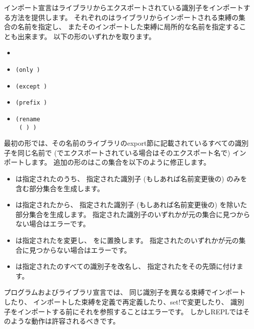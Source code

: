 インポート宣言はライブラリからエクスポートされている識別子をインポートする方法を提供します。
それぞれのはライブラリからインポートされる束縛の集合の名前を指定し、
またそのインポートした束縛に局所的な名前を指定することも出来ます。
以下の形のいずれかを取ります。

\begin{itemize}
\item {\tt{}}
\item {\tt(only   \dotsfoo)}
\item {\tt(except   \dotsfoo)}
\item {\tt(prefix  )}
\item {\tt(rename \\
{\obeyspaces%
\hspace*{4em}( ) \dotsfoo)}}
\end{itemize}

最初の形では、その名前のライブラリのexport節に記載されているすべての識別子を同じ名前で
(でエクスポートされている場合はそのエクスポート名で)
インポートします。
追加の形のはこの集合を以下のように修正します。

\begin{itemize}

\item {}は指定されたのうち、
指定された識別子 (もしあれば名前変更後の) のみを含む部分集合を生成します。

\item {}は指定されたから、
指定された識別子 (もしあれば名前変更後の) を除いた部分集合を生成します。
指定された識別子のいずれかが元の集合に見つからない場合はエラーです。

\item {}は指定されたを変更し、
をに置換します。
指定されたのいずれかが元の集合に見つからない場合はエラーです。

\item {}は指定されたのすべての識別子を改名し、
指定されたをその先頭に付けます。

\end{itemize}

プログラムおよびライブラリ宣言では、
同じ識別子を異なる束縛でインポートしたり、
インポートした束縛を定義で再定義したり、{\cf set!}で変更したり、
識別子をインポートする前にそれを参照することはエラーです。
しかしREPLではそのような動作は許容されるべきです。

